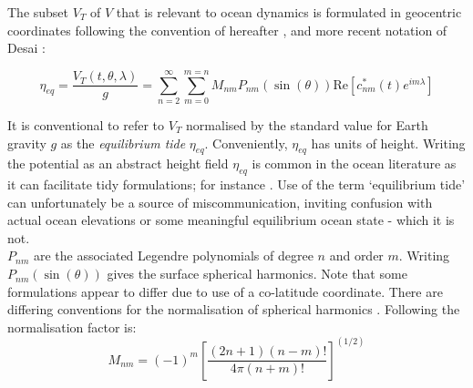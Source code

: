 The subset $V_T$ of $V$ that is relevant to ocean dynamics is formulated in geocentric coordinates following the convention of \cite{Cartwright:1973em} hereafter \CTE{}, and more recent notation of Desai \cite{Desai:2006wo}:

\begin{equation}
\label{E:VT}
\eta_{eq} = \frac{V_T(t,\theta,\lambda) }{g} = \sum_{n=2}^{\infty} \sum_{m=0}^{m=n} M_{nm} P_{nm}( \sin(\theta) ) \text{Re} \left [ c^{*}_{nm}(t) e^{im\lambda} \right ]
\end{equation}

It is conventional to refer to $V_T$ normalised by the standard value for Earth gravity $g$ as the \emph{equilibrium tide} $\eta_{eq}$.  Conveniently, $\eta_{eq}$ has units of height.  Writing the potential as an abstract height field $\eta_{eq}$ is common in the ocean literature as it can facilitate tidy formulations; for instance \cite[Eq 9.8.3]{gill1982atmosphere}.   Use of the term `equilibrium tide' can unfortunately be a source of miscommunication, inviting confusion with actual ocean elevations or some meaningful equilibrium ocean state - which it is not.\\

$P_{nm}$ are the associated Legendre polynomials of degree $n$ and order $m$.  Writing $P_{nm}( \sin(\theta) )$ gives the surface spherical harmonics.   Note that some formulations appear to differ due to use of a co-latitude coordinate.   There are differing conventions for the normalisation of spherical harmonics \citep[sec 6.5]{Anonymous:2004tm}. Following \CTE{} the normalisation factor is:
\begin{equation}
\label{E:M}
M_{nm} = (-1)^m \left [ \frac{(2n+1)(n-m)!}{ 4 \pi (n+m)!} \right ]^{(1/2)}
\end{equation}

